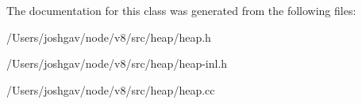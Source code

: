The documentation for this class was generated from the following files\+:\begin{DoxyCompactItemize}
\item 
/\+Users/joshgav/node/v8/src/heap/heap.\+h\item 
/\+Users/joshgav/node/v8/src/heap/heap-\/inl.\+h\item 
/\+Users/joshgav/node/v8/src/heap/heap.\+cc\end{DoxyCompactItemize}
